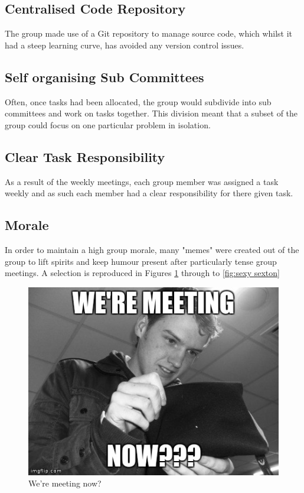 \subsection{Centralised Code Repository}
The group made use of a Git repository to manage source code, which whilst it had a steep learning curve, has avoided any version control issues.\\

\subsection{Self organising Sub Committees}
Often, once tasks had been allocated, the group would subdivide into sub committees and work on tasks together. 
This division meant that a subset of the group could focus on one particular problem in isolation.\\

\subsection{Clear Task Responsibility}
As a result of the weekly meetings, each group member was assigned a task weekly and as such each member had a clear responsibility for there given task.\\

\subsection{Morale}
\label{morale}
In order to maintain a high group morale, many "memes" were created out of the group to lift spirits and keep humour present after particularly tense group meetings. A selection is reproduced in Figures \ref{fig:we're meeting now?} through to \ref{fig:sexy sexton}

\begin{figure}[h]
\begin{center}
\includegraphics[scale=0.4]{./design/nathan} 
\end{center}
\caption{We're meeting now?}
\label{fig:we're meeting now?}
\end{figure} 


